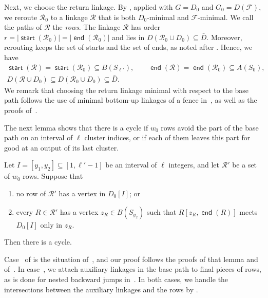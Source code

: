 \documentclass[fontsize=12pt,leading=14pt]{fullpaper}
\DeclareMathOperator{\st}{\mathsf{start}}
\DeclareMathOperator{\en}{\mathsf{end}}
\newcommand{\Fcal}{\mathcal{F}}
\newcommand{\Rcal}{\mathcal{R}}
\begin{document}
Next, we choose the return linkage.
By , applied with $G=D_0$ and $G_0=D(\Fcal)$, we reroute $\Rcal_0$ to a linkage $\Rcal$ that is both $D_0$-minimal and $\Fcal$-minimal.
We call the paths of $\Rcal$ the \emph{rows}.
The linkage $\Rcal$ has order $r=|\st(\Rcal_0)|=|\en(\Rcal_0)|$ and lies in $D(\Rcal_0\cup D_0)\subseteq\bar D$.
Moreover, rerouting keeps the set of starts and the set of ends, as noted after .
Hence, we have
\begin{equation}\label{eq:stage2-rows}
  \begin{gathered}
    \st(\Rcal)=\st(\Rcal_0)\subseteq B(S_{\ell'}),\qquad\en(\Rcal)=\en(\Rcal_0)\subseteq A(S_0),\\
    D(\Rcal\cup D_0)\subseteq D(\Rcal_0\cup D_0)\subseteq\bar D.
  \end{gathered}
\end{equation}
We remark that choosing the return linkage minimal with respect to the base path follows the use of minimal bottom-up linkages of a fence in~\cite[Definition~5.22 and Theorem~6.1]{KawarabayashiK15}, as well as the proofs of~\cite[Theorem~1.2 and Lemma~4.10]{HKMM26b}.

The next lemma shows that there is a cycle if $w_0$ rows avoid the part of the base path on an interval of $\ell$ cluster indices, or if each of them leaves this part for good at an output of its last cluster.

\begin{lemma}\label{lem:close-rows}
  Let $I=[y_1,y_2]\subseteq[1,\ell'-1]$ be an interval of $\ell$ integers, and let $\Rcal'$ be a set of $w_0$ rows.
  Suppose that
  \begin{enumerate}[label=\textnormal{(\alph*)}]
    \item\label{item:close-rows-a} no row of $\Rcal'$ has a vertex in $D_0[I]$; or
    \item\label{item:close-rows-b} every $R\in\Rcal'$ has a vertex $z_R\in B(S_{y_2})$ such that $R[z_R,\en(R)]$ meets $D_0[I]$ only in $z_R$.
  \end{enumerate}
  Then there is a cycle.
\end{lemma}

Case~ of  is the situation of~\cite[Lemma~4.2]{HKMM26b}, and our proof follows the proofs of that lemma and of~\cite[Observation~4.1]{HKMM26b}.
In case~, we attach auxiliary linkages in the base path to final pieces of rows, as is done for nested backward jumps in~\cite[proof of Lemma~4.6, Case~2]{HKMM26b}.
In both cases, we handle the intersections between the auxiliary linkages and the rows by .
\end{document}
